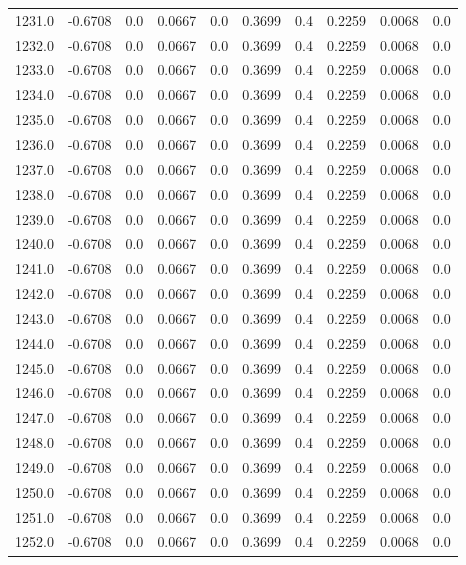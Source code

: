 \begin{longtable}{lrrrrrrrrr}
1231.0 & -0.6708 & 0.0 & 0.0667 & 0.0 & 0.3699 & 0.4 & 0.2259 & 0.0068 & 0.0 \\
1232.0 & -0.6708 & 0.0 & 0.0667 & 0.0 & 0.3699 & 0.4 & 0.2259 & 0.0068 & 0.0 \\
1233.0 & -0.6708 & 0.0 & 0.0667 & 0.0 & 0.3699 & 0.4 & 0.2259 & 0.0068 & 0.0 \\
1234.0 & -0.6708 & 0.0 & 0.0667 & 0.0 & 0.3699 & 0.4 & 0.2259 & 0.0068 & 0.0 \\
1235.0 & -0.6708 & 0.0 & 0.0667 & 0.0 & 0.3699 & 0.4 & 0.2259 & 0.0068 & 0.0 \\
1236.0 & -0.6708 & 0.0 & 0.0667 & 0.0 & 0.3699 & 0.4 & 0.2259 & 0.0068 & 0.0 \\
1237.0 & -0.6708 & 0.0 & 0.0667 & 0.0 & 0.3699 & 0.4 & 0.2259 & 0.0068 & 0.0 \\
1238.0 & -0.6708 & 0.0 & 0.0667 & 0.0 & 0.3699 & 0.4 & 0.2259 & 0.0068 & 0.0 \\
1239.0 & -0.6708 & 0.0 & 0.0667 & 0.0 & 0.3699 & 0.4 & 0.2259 & 0.0068 & 0.0 \\
1240.0 & -0.6708 & 0.0 & 0.0667 & 0.0 & 0.3699 & 0.4 & 0.2259 & 0.0068 & 0.0 \\
1241.0 & -0.6708 & 0.0 & 0.0667 & 0.0 & 0.3699 & 0.4 & 0.2259 & 0.0068 & 0.0 \\
1242.0 & -0.6708 & 0.0 & 0.0667 & 0.0 & 0.3699 & 0.4 & 0.2259 & 0.0068 & 0.0 \\
1243.0 & -0.6708 & 0.0 & 0.0667 & 0.0 & 0.3699 & 0.4 & 0.2259 & 0.0068 & 0.0 \\
1244.0 & -0.6708 & 0.0 & 0.0667 & 0.0 & 0.3699 & 0.4 & 0.2259 & 0.0068 & 0.0 \\
1245.0 & -0.6708 & 0.0 & 0.0667 & 0.0 & 0.3699 & 0.4 & 0.2259 & 0.0068 & 0.0 \\
1246.0 & -0.6708 & 0.0 & 0.0667 & 0.0 & 0.3699 & 0.4 & 0.2259 & 0.0068 & 0.0 \\
1247.0 & -0.6708 & 0.0 & 0.0667 & 0.0 & 0.3699 & 0.4 & 0.2259 & 0.0068 & 0.0 \\
1248.0 & -0.6708 & 0.0 & 0.0667 & 0.0 & 0.3699 & 0.4 & 0.2259 & 0.0068 & 0.0 \\
1249.0 & -0.6708 & 0.0 & 0.0667 & 0.0 & 0.3699 & 0.4 & 0.2259 & 0.0068 & 0.0 \\
1250.0 & -0.6708 & 0.0 & 0.0667 & 0.0 & 0.3699 & 0.4 & 0.2259 & 0.0068 & 0.0 \\
1251.0 & -0.6708 & 0.0 & 0.0667 & 0.0 & 0.3699 & 0.4 & 0.2259 & 0.0068 & 0.0 \\
1252.0 & -0.6708 & 0.0 & 0.0667 & 0.0 & 0.3699 & 0.4 & 0.2259 & 0.0068 & 0.0 \\

\end{longtable}
